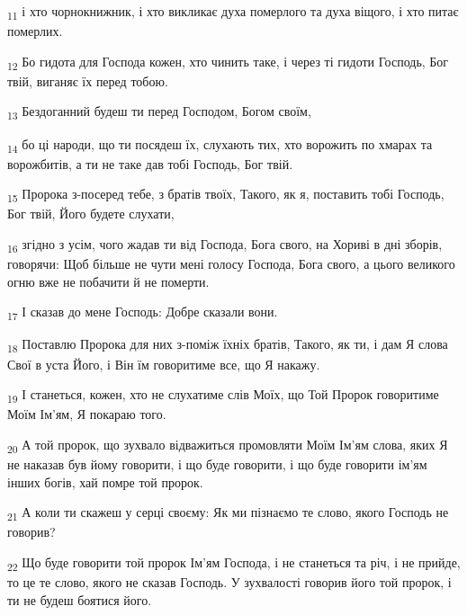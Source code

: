\begin{tcolorbox}
\textsubscript{11} і хто чорнокнижник, і хто викликає духа померлого та духа віщого, і хто питає померлих.
\end{tcolorbox}
\begin{tcolorbox}
\textsubscript{12} Бо гидота для Господа кожен, хто чинить таке, і через ті гидоти Господь, Бог твій, виганяє їх перед тобою.
\end{tcolorbox}
\begin{tcolorbox}
\textsubscript{13} Бездоганний будеш ти перед Господом, Богом своїм,
\end{tcolorbox}
\begin{tcolorbox}
\textsubscript{14} бо ці народи, що ти посядеш їх, слухають тих, хто ворожить по хмарах та ворожбитів, а ти не таке дав тобі Господь, Бог твій.
\end{tcolorbox}
\begin{tcolorbox}
\textsubscript{15} Пророка з-посеред тебе, з братів твоїх, Такого, як я, поставить тобі Господь, Бог твій, Його будете слухати,
\end{tcolorbox}
\begin{tcolorbox}
\textsubscript{16} згідно з усім, чого жадав ти від Господа, Бога свого, на Хориві в дні зборів, говорячи: Щоб більше не чути мені голосу Господа, Бога свого, а цього великого огню вже не побачити й не померти.
\end{tcolorbox}
\begin{tcolorbox}
\textsubscript{17} І сказав до мене Господь: Добре сказали вони.
\end{tcolorbox}
\begin{tcolorbox}
\textsubscript{18} Поставлю Пророка для них з-поміж їхніх братів, Такого, як ти, і дам Я слова Свої в уста Його, і Він їм говоритиме все, що Я накажу.
\end{tcolorbox}
\begin{tcolorbox}
\textsubscript{19} І станеться, кожен, хто не слухатиме слів Моїх, що Той Пророк говоритиме Моїм Ім'ям, Я покараю того.
\end{tcolorbox}
\begin{tcolorbox}
\textsubscript{20} А той пророк, що зухвало відважиться промовляти Моїм Ім'ям слова, яких Я не наказав був йому говорити, і що буде говорити, і що буде говорити ім'ям інших богів, хай помре той пророк.
\end{tcolorbox}
\begin{tcolorbox}
\textsubscript{21} А коли ти скажеш у серці своєму: Як ми пізнаємо те слово, якого Господь не говорив?
\end{tcolorbox}
\begin{tcolorbox}
\textsubscript{22} Що буде говорити той пророк Ім'ям Господа, і не станеться та річ, і не прийде, то це те слово, якого не сказав Господь. У зухвалості говорив його той пророк, і ти не будеш боятися його.
\end{tcolorbox}
